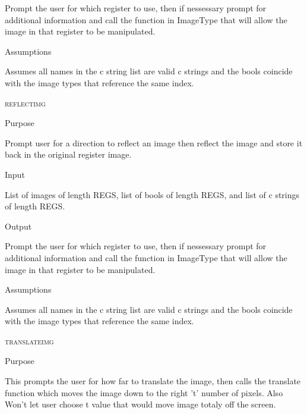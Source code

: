 \documentclass[pdftex, 11pt]{article}
\begin{document}
\begin{description}
\begin{description}
				Prompt the user for which register to use, then if nessessary
				prompt for additional information and call the function
				in ImageType that will allow the image in that register to
				be manipulated.

			\item{Assumptions}

				Assumes all names in the c string list are valid c
				strings and the bools coincide with the image types that
				reference the same index.

		\end{description}



	\item{\textsc{reflectimg}}
		\begin{description}
			\item{Purpose}

				Prompt user for a direction to reflect an image then reflect the image and
				store it back in the original register image.

			\item{Input}

				List of images of length REGS, list of bools of length
				REGS, and list of c strings of length REGS.

			\item{Output}

				Prompt the user for which register to use, then if nessessary
				prompt for additional information and call the function
				in ImageType that will allow the image in that register to
				be manipulated.

			\item{Assumptions}

				Assumes all names in the c string list are valid c
				strings and the bools coincide with the image types that
				reference the same index.

		\end{description}



	\item{\textsc{translateimg}}
		\begin{description}
			\item{Purpose}
			
				This prompts the user for how far to translate the image, then calls the
				translate function which moves the image down to the right 't' number of
				pixels.  Also Won't let user choose t value that would move image totaly off
				the screen.


\end{description}
\end{description}
\end{document}
